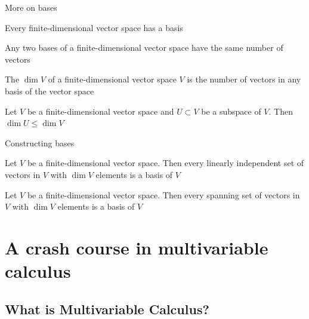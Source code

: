 \documentclass[aspectratio=169]{beamer}\usepackage[]{graphicx}\usepackage[]{xcolor}
\begin{document}
\begin{frame}{More on bases}
	\begin{theorem}
	Every finite-dimensional vector space has a basis
	\end{theorem}
	\vfill
	\begin{importanttheorem}
		Any two bases of a finite-dimensional vector space have the same number of vectors
	\end{importanttheorem}
	\vfill
	\begin{definition}[Dimension]
		The  $\dim V$ of a finite-dimensional vector space $V$ is the number of vectors in any basis of the vector space
	\end{definition}
	\vfill
	\begin{theorem}
		Let $V$ be a finite-dimensional vector space and $U\subset V$ be a subspace of $V$. Then $\dim U\leq \dim V$
	\end{theorem}
\end{frame}


\begin{frame}{Constructing bases}
	\begin{theorem}
		Let $V$ be a finite-dimensional vector space. Then every linearly independent set of vectors in $V$ with $\dim V$ elements is a basis of $V$
	\end{theorem}
	\vfill
	\begin{theorem}
		Let $V$ be a finite-dimensional vector space. Then every spanning set of vectors in $V$ with $\dim V$ elements is a basis of $V$
	\end{theorem}
\end{frame}




\section{A crash course in multivariable calculus}


\subsection{What is Multivariable Calculus?}
\end{document}
